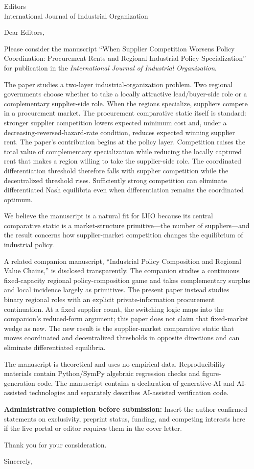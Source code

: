 \documentclass[11pt]{letter}
\begin{document}
\begin{letter}{Editors\\International Journal of Industrial Organization}
\opening{Dear Editors,}

Please consider the manuscript ``When Supplier Competition Worsens Policy Coordination: Procurement Rents and Regional Industrial-Policy Specialization'' for publication in the \emph{International Journal of Industrial Organization}.

The paper studies a two-layer industrial-organization problem. Two regional governments choose whether to take a locally attractive lead/buyer-side role or a complementary supplier-side role. When the regions specialize, suppliers compete in a procurement market. The procurement comparative static itself is standard: stronger supplier competition lowers expected minimum cost and, under a decreasing-reversed-hazard-rate condition, reduces expected winning supplier rent. The paper's contribution begins at the policy layer. Competition raises the total value of complementary specialization while reducing the locally captured rent that makes a region willing to take the supplier-side role. The coordinated differentiation threshold therefore falls with supplier competition while the decentralized threshold rises. Sufficiently strong competition can eliminate differentiated Nash equilibria even when differentiation remains the coordinated optimum.

We believe the manuscript is a natural fit for IJIO because its central comparative static is a market-structure primitive---the number of suppliers---and the result concerns how supplier-market competition changes the equilibrium of industrial policy.

A related companion manuscript, ``Industrial Policy Composition and Regional Value Chains,'' is disclosed transparently. The companion studies a continuous fixed-capacity regional policy-composition game and takes complementary surplus and local incidence largely as primitives. The present paper instead studies binary regional roles with an explicit private-information procurement continuation. At a fixed supplier count, the switching logic maps into the companion's reduced-form argument; this paper does not claim that fixed-market wedge as new. The new result is the supplier-market comparative static that moves coordinated and decentralized thresholds in opposite directions and can eliminate differentiated equilibria.

The manuscript is theoretical and uses no empirical data. Reproducibility materials contain Python/SymPy algebraic regression checks and figure-generation code. The manuscript contains a declaration of generative-AI and AI-assisted technologies and separately describes AI-assisted verification code.

\textbf{Administrative completion before submission:} Insert the author-confirmed statements on exclusivity, preprint status, funding, and competing interests here if the live portal or editor requires them in the cover letter.

Thank you for your consideration.

\closing{Sincerely,}
\end{letter}
\end{document}
